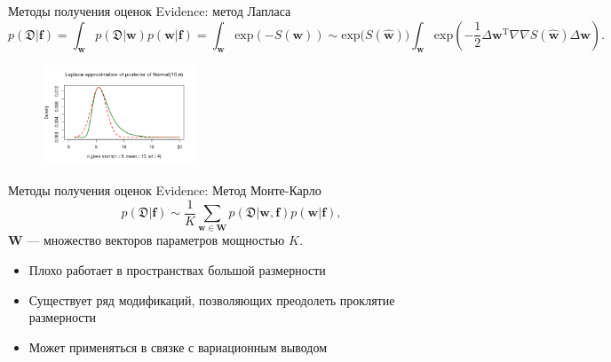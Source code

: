 \documentclass[10pt,pdf,utf8,russian,aspectratio=169]{beamer}
\begin{document}
\begin{frame}{Методы получения оценок Evidence: метод Лапласа}
$$
	p(\mathfrak{D}|\mathbf{f}) = \int_\mathbf{w} p(\mathfrak{D}|\mathbf{w}) p(\mathbf{w}|\mathbf{f}) = \int_\mathbf{w} \text{exp}(-S(\mathbf{w}))	\sim  \text{exp}\bigl(S(\hat{\mathbf{w}})\bigr) \int_\mathbf{w} \text{exp} (-\frac{1}{2}\Delta \mathbf{w}^\text{T} \nabla \nabla S(\hat{\mathbf{w}}) \Delta \mathbf{w} ).
$$

\begin{figure}
  \centering
 \includegraphics[width=0.4\textwidth]{laplace2.png}
\label{fig:1}\qquad	
\end{figure}

\end{frame}
\begin{frame}{Методы получения оценок Evidence: Метод Монте-Карло}
$$
p(\mathfrak{D}|\mathbf{f})  \sim \frac{1}{K}\sum_{\mathbf{w} \in \mathbf{W}} p(\mathfrak{D}|\mathbf{w},\mathbf{f})p(\mathbf{w}|\mathbf{f}),
$$
$\mathbf{W}$ --- множество векторов параметров мощностью $K$.

\begin{itemize}
\item Плохо работает в пространствах большой размерности
\item Существует ряд модификаций, позволяющих преодолеть проклятие размерности
\item Может применяться в связке с вариационным выводом
\end{itemize}
\end{frame}
\end{document}
